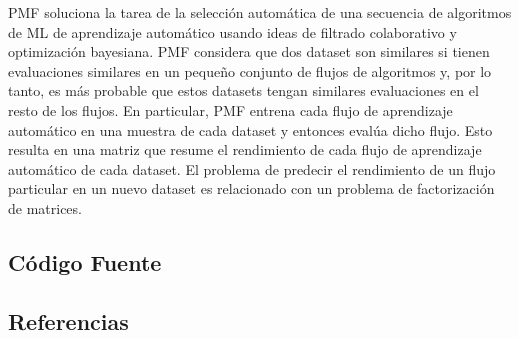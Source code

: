 \documentclass[a4paper,10pt,twocolumn]{article}
\begin{document}
PMF \cite{fusi2018advances} soluciona la tarea de la selección automática de una secuencia de algoritmos de ML de aprendizaje automático usando ideas de filtrado colaborativo y optimización bayesiana. PMF considera que dos dataset son similares si tienen evaluaciones similares en un pequeño conjunto de flujos de algoritmos y, por lo tanto, es más probable que estos datasets tengan similares evaluaciones en el resto de los flujos. En particular, PMF entrena cada flujo de aprendizaje automático en una muestra de cada dataset y entonces evalúa dicho flujo. Esto resulta en una matriz que resume el rendimiento de cada flujo de aprendizaje automático de cada dataset. El problema de predecir el rendimiento de un flujo particular en un nuevo dataset es relacionado con un problema de factorización de matrices.

	\subsection{Código Fuente}\label{sub:listings}





	\subsection{Referencias}
\end{document}
